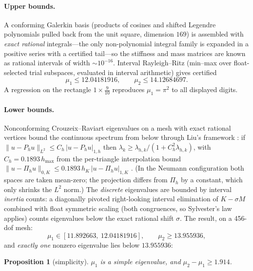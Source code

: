 \documentclass[11pt]{article}
\newtheorem{proposition}{Proposition}
\newcommand{\norm}[1]{\lVert #1 \rVert}
\begin{document}
\paragraph{Upper bounds.}
A conforming Galerkin basis (products of cosines and shifted Legendre
polynomials pulled back from the unit square, dimension $169$) is
assembled with \emph{exact rational} integrals---the only
non-polynomial integral family is expanded in a positive series with a
certified tail---so the stiffness and mass matrices are known as
rational intervals of width ${\sim}10^{-16}$. Interval Rayleigh--Ritz
(min--max over float-selected trial subspaces, evaluated in interval
arithmetic) gives certified
\begin{equation}\label{eq:uppers}
\mu_1 \le 12.04181916, \qquad \mu_2 \le 14.12684697 .
\end{equation}
A regression on the rectangle $1\times\frac{9}{10}$ reproduces
$\mu_1=\pi^2$ to all displayed digits.

\paragraph{Lower bounds.}
Nonconforming Crouzeix--Raviart \cite{CrouzeixRaviart} eigenvalues on a
mesh with exact rational vertices bound the continuous spectrum from
below through Liu's framework \cite{Liu2015}: if
$\norm{u-P_hu}_{L^2}\le C_h\,|u-P_hu|_{1,h}$ then
$\lambda_k \ge \lambda_{h,k}/(1+C_h^2\lambda_{h,k})$, with
$C_h=0.1893\,h_{\max}$ from the per-triangle interpolation bound
$\norm{u-\Pi_hu}_{0,K}\le 0.1893\,h_K\,|u-\Pi_hu|_{1,K}$
\cite{YouXieLiu}. (In the Neumann configuration both spaces are taken
mean-zero; the projection differs from $\Pi_h$ by a constant, which only
shrinks the $L^2$ norm.) The \emph{discrete} eigenvalues are bounded by
interval \emph{inertia} counts: a diagonally pivoted right-looking
interval elimination of $K-\sigma M$ combined with float symmetric
scaling (both congruences, so Sylvester's law applies) counts
eigenvalues below the exact rational shift $\sigma$. The result, on a
456-dof mesh:
\begin{equation}\label{eq:spec}
\mu_1 \in [11.892663,\ 12.04181916], \qquad \mu_2 \ge 13.955936,
\end{equation}
and \emph{exactly one} nonzero eigenvalue lies below $13.955936$:

\begin{proposition}[simplicity]\label{prop:simple}
$\mu_1$ is a simple eigenvalue, and $\mu_2-\mu_1 \ge 1.914$.
\end{proposition}
\end{document}
